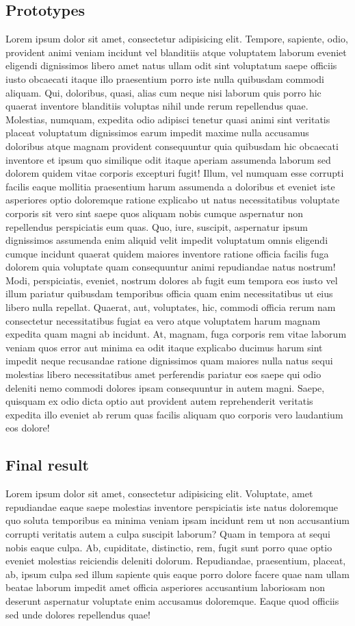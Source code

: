 \documentclass[a4paper,12pt]{report}
\begin{document}
\subsection{Prototypes}
Lorem ipsum dolor sit amet, consectetur adipisicing elit. Tempore, sapiente, odio, provident animi veniam incidunt vel blanditiis atque voluptatem laborum eveniet eligendi dignissimos libero amet natus ullam odit sint voluptatum saepe officiis iusto obcaecati itaque illo praesentium porro iste nulla quibusdam commodi aliquam. Qui, doloribus, quasi, alias cum neque nisi laborum quis porro hic quaerat inventore blanditiis voluptas nihil unde rerum repellendus quae. Molestias, numquam, expedita odio adipisci tenetur quasi animi sint veritatis placeat voluptatum dignissimos earum impedit maxime nulla accusamus doloribus atque magnam provident consequuntur quia quibusdam hic obcaecati inventore et ipsum quo similique odit itaque aperiam assumenda laborum sed dolorem quidem vitae corporis excepturi fugit! Illum, vel numquam esse corrupti facilis eaque mollitia praesentium harum assumenda a doloribus et eveniet iste asperiores optio doloremque ratione explicabo ut natus necessitatibus voluptate corporis sit vero sint saepe quos aliquam nobis cumque aspernatur non repellendus perspiciatis eum quas. Quo, iure, suscipit, aspernatur ipsum dignissimos assumenda enim aliquid velit impedit voluptatum omnis eligendi cumque incidunt quaerat quidem maiores inventore ratione officia facilis fuga dolorem quia voluptate quam consequuntur animi repudiandae natus nostrum! Modi, perspiciatis, eveniet, nostrum dolores ab fugit eum tempora eos iusto vel illum pariatur quibusdam temporibus officia quam enim necessitatibus ut eius libero nulla repellat. Quaerat, aut, voluptates, hic, commodi officia rerum nam consectetur necessitatibus fugiat ea vero atque voluptatem harum magnam expedita quam magni ab incidunt. At, magnam, fuga corporis rem vitae laborum veniam quos error aut minima ea odit itaque explicabo ducimus harum sint impedit neque recusandae ratione dignissimos quam maiores nulla natus sequi molestias libero necessitatibus amet perferendis pariatur eos saepe qui odio deleniti nemo commodi dolores ipsam consequuntur in autem magni. Saepe, quisquam ex odio dicta optio aut provident autem reprehenderit veritatis expedita illo eveniet ab rerum quas facilis aliquam quo corporis vero laudantium eos dolore!
\subsection{Final result}
Lorem ipsum dolor sit amet, consectetur adipisicing elit. Voluptate, amet repudiandae eaque saepe molestias inventore perspiciatis iste natus doloremque quo soluta temporibus ea minima veniam ipsam incidunt rem ut non accusantium corrupti veritatis autem a culpa suscipit laborum? Quam in tempora at sequi nobis eaque culpa. Ab, cupiditate, distinctio, rem, fugit sunt porro quae optio eveniet molestias reiciendis deleniti dolorum. Repudiandae, praesentium, placeat, ab, ipsum culpa sed illum sapiente quis eaque porro dolore facere quae nam ullam beatae laborum impedit amet officia asperiores accusantium laboriosam non deserunt aspernatur voluptate enim accusamus doloremque. Eaque quod officiis sed unde dolores repellendus quae!
\end{document}
